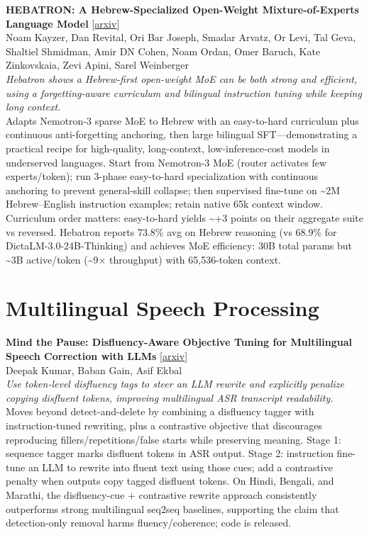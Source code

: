 \documentclass[12pt,letterpaper]{article}
\begin{document}
\medskip

{\small\textbf{HEBATRON: A Hebrew-Specialized Open-Weight Mixture-of-Experts Language Model}} {\scriptsize[\href{https://arxiv.org/abs/2605.11255}{arxiv}]}\\
{\scriptsize Noam Kayzer, Dan Revital, Ori Bar Joseph, Smadar Arvatz, Or Levi, Tal Geva, Shaltiel Shmidman, Amir DN Cohen, Noam Ordan, Omer Baruch, Kate Zinkovskaia, Zevi Apini, Sarel Weinberger}\\

{\small\textit{Hebatron shows a Hebrew-first open-weight MoE can be both strong and efficient, using a forgetting-aware curriculum and bilingual instruction tuning while keeping long context.}}\\[1pt]
{\footnotesize Adapts Nemotron-3 sparse MoE to Hebrew with an easy-to-hard curriculum plus continuous anti-forgetting anchoring, then large bilingual SFT---demonstrating a practical recipe for high-quality, long-context, low-inference-cost models in underserved languages. Start from Nemotron-3 MoE (router activates few experts/token); run 3-phase easy-to-hard specialization with continuous anchoring to prevent general-skill collapse; then supervised fine-tune on \textasciitilde{}2M Hebrew--English instruction examples; retain native 65k context window. Curriculum order matters: easy-to-hard yields \textasciitilde{}+3 points on their aggregate suite vs reversed. Hebatron reports 73.8\% avg on Hebrew reasoning (vs 68.9\% for DictaLM-3.0-24B-Thinking) and achieves MoE efficiency: 30B total params but \textasciitilde{}3B active/token (\textasciitilde{}9× throughput) with 65,536-token context.}

\medskip


\section*{Multilingual Speech Processing}

{\small\textbf{Mind the Pause: Disfluency-Aware Objective Tuning for Multilingual Speech Correction with LLMs}} {\scriptsize[\href{https://arxiv.org/abs/2605.12242}{arxiv}]}\\
{\scriptsize Deepak Kumar, Baban Gain, Asif Ekbal}\\

{\small\textit{Use token-level disfluency tags to steer an LLM rewrite and explicitly penalize copying disfluent tokens, improving multilingual ASR transcript readability.}}\\[1pt]
{\footnotesize Moves beyond detect-and-delete by combining a disfluency tagger with instruction-tuned rewriting, plus a contrastive objective that discourages reproducing fillers/repetitions/false starts while preserving meaning. Stage 1: sequence tagger marks disfluent tokens in ASR output. Stage 2: instruction fine-tune an LLM to rewrite into fluent text using those cues; add a contrastive penalty when outputs copy tagged disfluent tokens. On Hindi, Bengali, and Marathi, the disfluency-cue + contrastive rewrite approach consistently outperforms strong multilingual seq2seq baselines, supporting the claim that detection-only removal harms fluency/coherence; code is released.}
\end{document}
